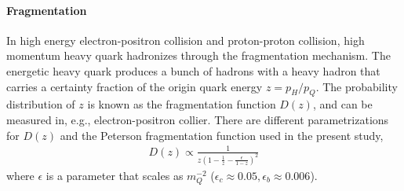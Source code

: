\paragraph{Fragmentation} 
In high energy electron-positron collision and proton-proton collision, high momentum heavy quark hadronizes through the fragmentation mechanism.
The energetic heavy quark produces a bunch of hadrons with a heavy hadron that carries a certainty fraction of the origin quark energy $z = p_H/p_Q$.
The probability distribution of $z$ is known as the fragmentation function $D(z)$, and can be measured in, e.g., electron-positron collier.
There are different parametrizations for $D(z)$ and the Peterson fragmentation function \cite{PhysRevD.27.105} used in the present study,
\begin{eqnarray}
D(z) \propto \frac{1}{z(1-\frac{1}{z} - \frac{\epsilon}{1-z})^2}
\end{eqnarray}
where $\epsilon$ is a parameter that scales as $m_Q^{-2}$ ($\epsilon_c \approx 0.05, \epsilon_b \approx 0.006$).

